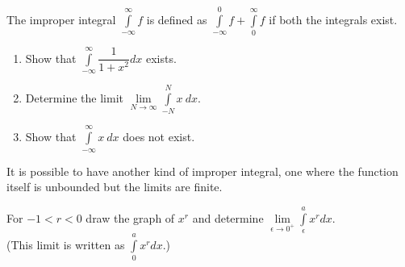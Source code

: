 \documentclass[9pt, a4paper, oneside]{amsart}
\begin{document}
\begin{questions}[resume]
		\item The improper integral $\int \limits_{-\infty}^ {\infty} f $ is defined as $\int \limits_{-\infty}^ 0 f + \int \limits_{0}^ \infty f $ if both the integrals exist.
		\begin{enumerate}
			\item Show that $ \int \limits_{-\infty}^ {\infty} \dfrac{1}{1+x^2} dx$ exists.
			\item Determine the limit $ \lim \limits_{N \rightarrow \infty} \int \limits_{-N}^ {N} x \: dx$.
			\item Show that $ \int \limits_{-\infty}^ {\infty} x \: dx$ does not exist.
		\end{enumerate}

		\item It is possible to have another kind of improper integral, one where the function itself is unbounded but the limits are finite.

		For $ -1 < r < 0$ draw the graph of $ x^r $ and determine $ \lim \limits_{\epsilon \rightarrow 0^+} \int \limits_\epsilon^a x^r dx$. \\(This limit is written as $\int \limits_0^a x^r dx$.)
	\end{questions}
\end{document}
